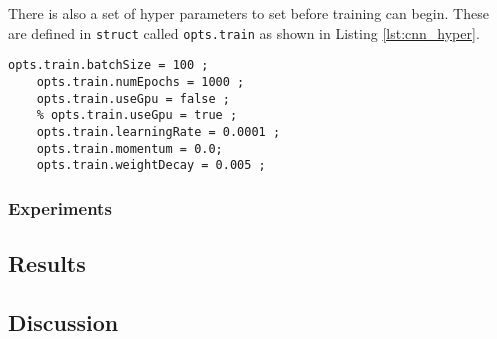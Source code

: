 \documentclass[Main]{subfiles}
\begin{document}
			There is also a set of hyper parameters to set before training can begin.
			These are defined in \texttt{struct} called \texttt{opts.train} as shown in Listing \ref{lst:cnn_hyper}.

			\newpage
			\begin{lstlisting}[caption=CNN setup hyper parameters, style=Code-Matlab, label=lst:cnn_hyper]
	opts.train.batchSize = 100 ;
	opts.train.numEpochs = 1000 ;
	opts.train.useGpu = false ;
	% opts.train.useGpu = true ;
	opts.train.learningRate = 0.0001 ;
	opts.train.momentum = 0.0;
	opts.train.weightDecay = 0.005 ;
			\end{lstlisting}

		
		\subsubsection{Experiments} %
			\label{ssub:experiments}
				 



	

	


	\subsection{Results} %
		\label{sub:cnn_results}



		


	\subsection{Discussion} %
		\label{sub:cnn_discussion}
		


	
\end{document}
